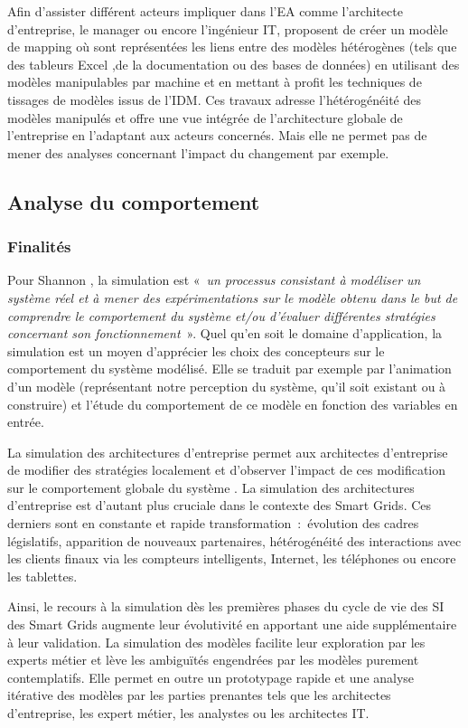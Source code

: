 	Afin d'assister différent acteurs impliquer dans l'EA comme l'architecte d'entreprise, le manager ou encore l'ingénieur IT, \cite{bruneliere2013support} proposent de créer un modèle de mapping où sont représentées les liens entre des modèles hétérogènes (tels que des tableurs Excel ,de la documentation ou des bases de données) en utilisant des modèles manipulables par machine et en mettant à profit les techniques de tissages de modèles issus de l'IDM. Ces travaux adresse l'hétérogénéité des modèles manipulés et offre une vue intégrée de l'architecture globale de l'entreprise en l'adaptant aux acteurs concernés. Mais elle ne permet pas de mener des analyses concernant l'impact du changement par exemple.   

	
	\subsection{Analyse du comportement}
	\subsubsection{Finalités}
	Pour Shannon \cite{shannon1975systems}, la simulation est 
«~\emph{un processus consistant à modéliser un système réel et à mener des expérimentations sur le modèle obtenu dans le but de comprendre le comportement du système et/ou d'évaluer différentes stratégies concernant son fonctionnement}~». 
Quel qu'en soit le domaine d'application, la simulation est un moyen d'apprécier les choix des concepteurs sur le comportement du système modélisé. Elle se traduit par exemple par l'animation d'un modèle (représentant notre perception du système, qu'il soit existant ou à construire) et l'étude du comportement de ce modèle en fonction des variables en entrée.  

La simulation des architectures d'entreprise permet aux architectes d'entreprise de modifier des stratégies localement et d'observer l'impact de ces modification sur le comportement globale du système \cite{2008towards}. La simulation des architectures d'entreprise est d'autant plus cruciale dans le contexte des Smart Grids. Ces derniers sont en constante et rapide transformation~:~évolution des cadres législatifs,  apparition de nouveaux partenaires, hétérogénéité des interactions avec les clients finaux via les compteurs intelligents, Internet, les téléphones ou encore les tablettes. 

Ainsi, le recours à la simulation dès les premières phases du cycle de vie des SI des Smart Grids augmente leur évolutivité en apportant une aide supplémentaire à leur validation. La simulation des modèles facilite leur exploration  par les experts métier et lève les ambiguïtés engendrées par les modèles purement contemplatifs. Elle permet en outre un prototypage rapide et une analyse itérative des modèles par les parties prenantes tels que les architectes d'entreprise, les expert métier, les analystes ou les architectes IT.

